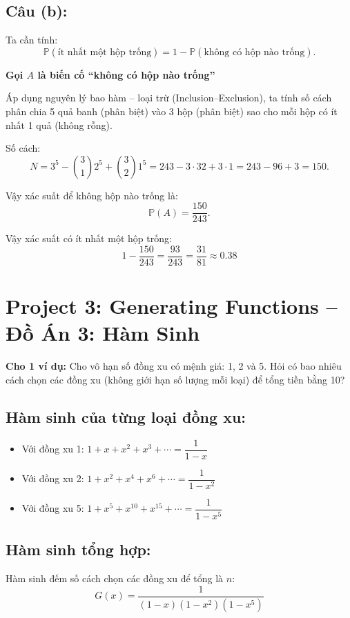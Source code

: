 \documentclass{article}
\begin{document}
	\subsection*{Câu (b):}
	Ta cần tính:
	\[
	\mathbb{P}(\text{ít nhất một hộp trống}) = 1 - \mathbb{P}(\text{không có hộp nào trống}).
	\]
	
	\textbf{Gọi $A$ là biến cố “không có hộp nào trống”}
	
	Áp dụng nguyên lý bao hàm – loại trừ (Inclusion–Exclusion), ta tính số cách phân chia 5 quả banh (phân biệt) vào 3 hộp (phân biệt) sao cho mỗi hộp có ít nhất 1 quả (không rỗng).
	
	Số cách:
	\[
	N = 3^5 - \binom{3}{1} 2^5 + \binom{3}{2} 1^5 = 243 - 3 \cdot 32 + 3 \cdot 1 = 243 - 96 + 3 = 150.
	\]
	
	Vậy xác suất để không hộp nào trống là:
	\[
	\mathbb{P}(A) = \frac{150}{243}.
	\]
	
	Vậy xác suất có ít nhất một hộp trống:
	\[
	1 - \frac{150}{243} = \frac{93}{243} = \frac{31}{81} \approx 0.38
	\]
	
	\section*{Project 3: Generating Functions -- Đồ Án 3: Hàm Sinh}
	
	\textbf{Cho 1 ví dụ:}
		Cho vô hạn số đồng xu có mệnh giá: 1, 2 và 5.  
	Hỏi có bao nhiêu cách chọn các đồng xu (không giới hạn số lượng mỗi loại) để tổng tiền bằng 10?
	
	\subsection*{Hàm sinh của từng loại đồng xu:}
	
	\begin{itemize}
		\item Với đồng xu 1: $1 + x + x^2 + x^3 + \cdots = \dfrac{1}{1 - x}$  
		\item Với đồng xu 2: $1 + x^2 + x^4 + x^6 + \cdots = \dfrac{1}{1 - x^2}$
		\item Với đồng xu 5: $1 + x^5 + x^{10} + x^{15} + \cdots = \dfrac{1}{1 - x^5}$
	\end{itemize}
	
	\subsection*{Hàm sinh tổng hợp:}
	
	Hàm sinh đếm số cách chọn các đồng xu để tổng là $n$:
	\[
	G(x) = \frac{1}{(1 - x)(1 - x^2)(1 - x^5)}
	\]
	
\end{document}
